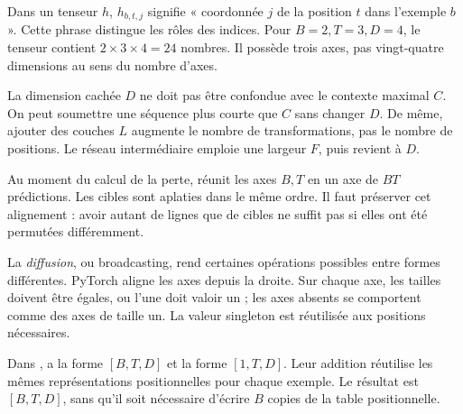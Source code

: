 Dans un tenseur \(h\), \(h_{b,t,j}\) signifie « coordonnée \(j\)
de la position \(t\) dans l'exemple \(b\) ». Cette phrase distingue
les rôles des indices. Pour \(B=2,T=3,D=4\), le tenseur contient
\(2\times3\times4=24\) nombres. Il possède trois axes, pas
vingt-quatre dimensions au sens du nombre d'axes.

La dimension cachée \(D\) ne doit pas être confondue avec le
contexte maximal \(C\). On peut soumettre une séquence plus courte
que \(C\) sans changer \(D\). De même, ajouter des couches \(L\)
augmente le nombre de transformations, pas le nombre de positions.
Le réseau intermédiaire emploie une largeur \(F\), puis revient à \(D\).

Au moment du calcul de la perte, 
réunit les axes \(B,T\) en un axe de \(BT\) prédictions.
Les cibles sont aplaties dans le même ordre. Il faut préserver
cet alignement : avoir autant de lignes que de cibles ne suffit
pas si elles ont été permutées différemment.



La \emph{diffusion}, ou broadcasting, rend certaines opérations
possibles entre formes différentes. PyTorch aligne les axes depuis
la droite. Sur chaque axe, les tailles doivent être égales, ou l'une
doit valoir un ; les axes absents se comportent comme des axes
de taille un. La valeur singleton est réutilisée aux positions nécessaires.

Dans ,
 a la forme \([B,T,D]\) et 
la forme \([1,T,D]\). Leur addition réutilise les mêmes
représentations positionnelles pour chaque exemple. Le résultat
est \([B,T,D]\), sans qu'il soit nécessaire d'écrire \(B\)
copies de la table positionnelle.

